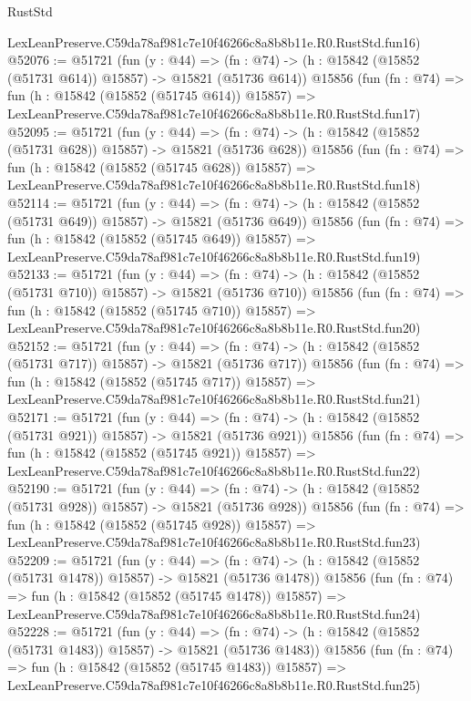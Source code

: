 \begin{lexlean}{RustStd}
\begin{coremodule}
    LexLeanPreserve.C59da78af981c7e10f46266c8a8b8b11e.R0.RustStd.fun16)
@52076 := @51721
    (fun (y : @44) =>
    (fn : @74) -> (h : @15842 (@15852 (@51731 @614)) @15857) -> @15821 (@51736 @614))
    @15856
    (fun (fn : @74) =>
    fun (h : @15842 (@15852 (@51745 @614)) @15857) =>
    LexLeanPreserve.C59da78af981c7e10f46266c8a8b8b11e.R0.RustStd.fun17)
@52095 := @51721
    (fun (y : @44) =>
    (fn : @74) -> (h : @15842 (@15852 (@51731 @628)) @15857) -> @15821 (@51736 @628))
    @15856
    (fun (fn : @74) =>
    fun (h : @15842 (@15852 (@51745 @628)) @15857) =>
    LexLeanPreserve.C59da78af981c7e10f46266c8a8b8b11e.R0.RustStd.fun18)
@52114 := @51721
    (fun (y : @44) =>
    (fn : @74) -> (h : @15842 (@15852 (@51731 @649)) @15857) -> @15821 (@51736 @649))
    @15856
    (fun (fn : @74) =>
    fun (h : @15842 (@15852 (@51745 @649)) @15857) =>
    LexLeanPreserve.C59da78af981c7e10f46266c8a8b8b11e.R0.RustStd.fun19)
@52133 := @51721
    (fun (y : @44) =>
    (fn : @74) -> (h : @15842 (@15852 (@51731 @710)) @15857) -> @15821 (@51736 @710))
    @15856
    (fun (fn : @74) =>
    fun (h : @15842 (@15852 (@51745 @710)) @15857) =>
    LexLeanPreserve.C59da78af981c7e10f46266c8a8b8b11e.R0.RustStd.fun20)
@52152 := @51721
    (fun (y : @44) =>
    (fn : @74) -> (h : @15842 (@15852 (@51731 @717)) @15857) -> @15821 (@51736 @717))
    @15856
    (fun (fn : @74) =>
    fun (h : @15842 (@15852 (@51745 @717)) @15857) =>
    LexLeanPreserve.C59da78af981c7e10f46266c8a8b8b11e.R0.RustStd.fun21)
@52171 := @51721
    (fun (y : @44) =>
    (fn : @74) -> (h : @15842 (@15852 (@51731 @921)) @15857) -> @15821 (@51736 @921))
    @15856
    (fun (fn : @74) =>
    fun (h : @15842 (@15852 (@51745 @921)) @15857) =>
    LexLeanPreserve.C59da78af981c7e10f46266c8a8b8b11e.R0.RustStd.fun22)
@52190 := @51721
    (fun (y : @44) =>
    (fn : @74) -> (h : @15842 (@15852 (@51731 @928)) @15857) -> @15821 (@51736 @928))
    @15856
    (fun (fn : @74) =>
    fun (h : @15842 (@15852 (@51745 @928)) @15857) =>
    LexLeanPreserve.C59da78af981c7e10f46266c8a8b8b11e.R0.RustStd.fun23)
@52209 := @51721
    (fun (y : @44) =>
    (fn : @74) -> (h : @15842 (@15852 (@51731 @1478)) @15857) -> @15821 (@51736 @1478))
    @15856
    (fun (fn : @74) =>
    fun (h : @15842 (@15852 (@51745 @1478)) @15857) =>
    LexLeanPreserve.C59da78af981c7e10f46266c8a8b8b11e.R0.RustStd.fun24)
@52228 := @51721
    (fun (y : @44) =>
    (fn : @74) -> (h : @15842 (@15852 (@51731 @1483)) @15857) -> @15821 (@51736 @1483))
    @15856
    (fun (fn : @74) =>
    fun (h : @15842 (@15852 (@51745 @1483)) @15857) =>
    LexLeanPreserve.C59da78af981c7e10f46266c8a8b8b11e.R0.RustStd.fun25)

\end{coremodule}
\end{lexlean}
